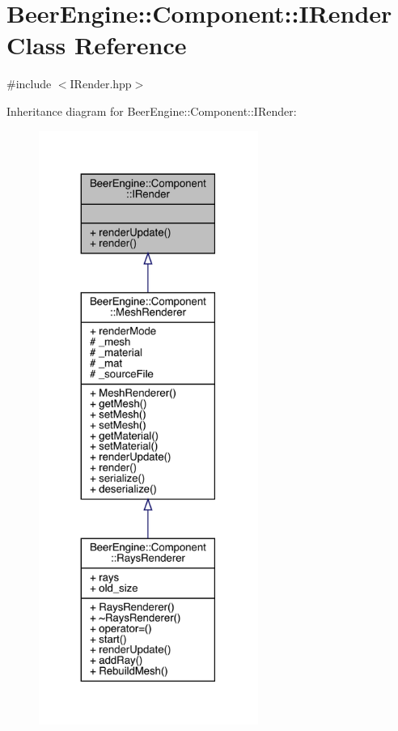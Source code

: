 \hypertarget{class_beer_engine_1_1_component_1_1_i_render}{}\section{Beer\+Engine\+:\+:Component\+:\+:I\+Render Class Reference}
\label{class_beer_engine_1_1_component_1_1_i_render}


{\ttfamily \#include $<$I\+Render.\+hpp$>$}



Inheritance diagram for Beer\+Engine\+:\+:Component\+:\+:I\+Render\+:\nopagebreak
\begin{figure}[H]
\begin{center}
\leavevmode
\includegraphics[height=550pt]{class_beer_engine_1_1_component_1_1_i_render__inherit__graph}
\end{center}
\end{figure}


